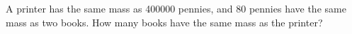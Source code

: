 A printer has the same mass as 400000 pennies, and 80 pennies have the same mass as two books. How many books have the same mass as the printer?
